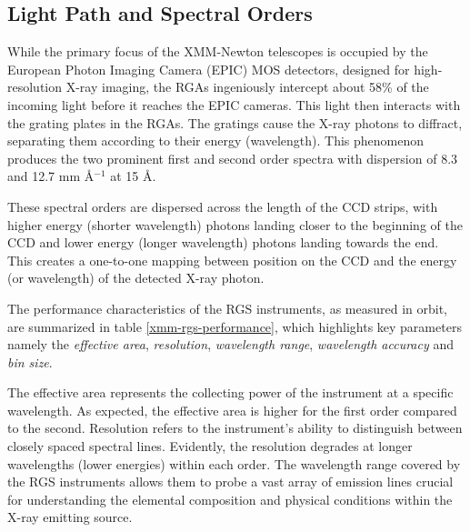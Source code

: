 		\subsection{Light Path and Spectral Orders}
			While the primary focus of the XMM-Newton telescopes is occupied by the European Photon Imaging Camera (EPIC) MOS detectors, designed for high-resolution X-ray imaging, the RGAs ingeniously intercept about 58\% of the incoming light before it reaches the EPIC cameras. This light then interacts with the grating plates in the RGAs. The gratings cause the X-ray photons to diffract, separating them according to their energy (wavelength). This phenomenon produces the two prominent first and second order spectra with dispersion of 8.3 and 12.7 mm \AA$^{-1}$ at 15 \AA.
			
			These spectral orders are dispersed across the length of the CCD strips, with higher energy (shorter wavelength) photons landing closer to the beginning of the CCD and lower energy (longer wavelength) photons landing towards the end. This creates a one-to-one mapping between position on the CCD and the energy (or wavelength) of the detected X-ray photon.
			
			The performance characteristics of the RGS instruments, as measured in orbit, are summarized in table \ref{xmm-rgs-performance}, which highlights key parameters namely the \textit{effective area}, \textit{resolution}, \textit{wavelength range}, \textit{wavelength accuracy} and \textit{bin size}.
	
			The effective area represents the collecting power of the instrument at a specific wavelength. As expected, the effective area is higher for the first order compared to the second. Resolution refers to the instrument's ability to distinguish between closely spaced spectral lines. Evidently, the resolution degrades at longer wavelengths (lower energies) within each order. The wavelength range covered by the RGS instruments allows them to probe a vast array of emission lines crucial for understanding the elemental composition and physical conditions within the X-ray emitting source.
			
